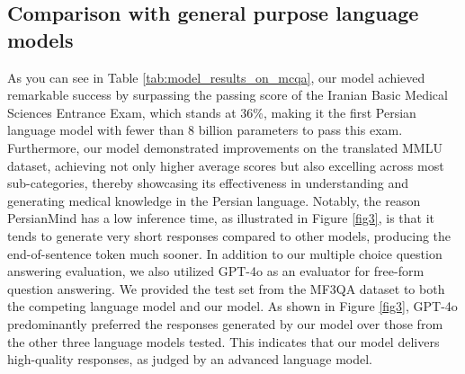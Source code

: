 \documentclass[conference]{IEEEtran}
\begin{document}
	\subsection{Comparison with general purpose language models}
	As you can see in Table \ref{tab:model_results_on_mcqa}, our model achieved remarkable success by surpassing the passing score of the Iranian Basic Medical Sciences Entrance Exam, which stands at 36\%, making it the first Persian language model with fewer than 8 billion parameters to pass this exam. Furthermore, our model demonstrated improvements on the translated MMLU dataset, achieving not only higher average scores but also excelling across most sub-categories, thereby showcasing its effectiveness in understanding and generating medical knowledge in the Persian language. Notably, the reason PersianMind has a low inference time, as illustrated in Figure \ref{fig3}, is that it tends to generate very short responses compared to other models, producing the end-of-sentence token much sooner. In addition to our multiple choice question answering evaluation, we also utilized GPT-4o \cite{b32} as an evaluator for free-form question answering. We provided the test set from the MF3QA dataset to both the competing language model and our model. As shown in Figure \ref{fig3}, GPT-4o predominantly preferred the responses generated by our model over those from the other three language models tested. This indicates that our model delivers high-quality responses, as judged by an advanced language model.
\end{document}
